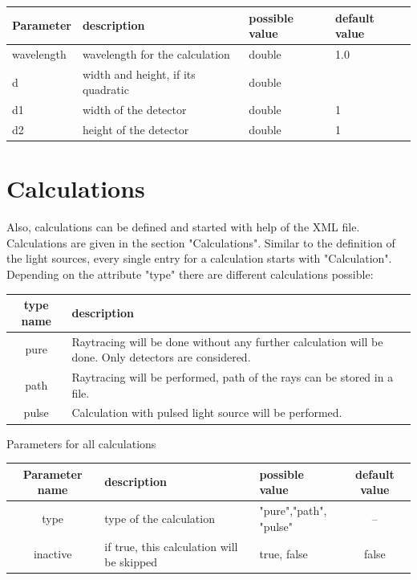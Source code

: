 \documentclass[a4paper,html,11pt,openany]{book}
\begin{document}
\begin{tabular}{p{2cm}|m{3.5cm}|m{3.0cm}|p{1.7cm}}
 Parameter  & description  & possible value & default value\\
 \hline 
 wavelength & wavelength for the calculation & double & 1.0 \\
 \hline
 d & width and height, if its quadratic & double &\\ 
 \hline
 d1 & width of the detector & double & 1 \\
\hline 
 d2 & height of the detector & double & 1 \\
 \hline  
 \end{tabular}   
 
  
  
 \chapter {Calculations}
 Also, calculations can be defined and started with help of the XML file. Calculations are given in the section "Calculations". Similar to the definition of the light sources, every single entry for a calculation starts with "Calculation". Depending on the attribute "type" there are different calculations possible:
 
 \vspace{1em}
 \begin{tabular}{c|m{8cm}}
 type name & description \\
 \hline
 pure & Raytracing will be done without any further calculation will be done. Only detectors are considered.\\
 \hline 
 path & Raytracing will be performed, path of the rays can be stored in a file. \\
  \hline
 pulse & Calculation with pulsed light source will be performed.
 \end{tabular}
 
 \vspace{1em}

 Parameters for all calculations
 \begin{table}[h!]
\fontsize{10pt}{10pt}\selectfont
 \begin{tabular}{c|m{3cm}|m{3cm}|c}
  Parameter name & description  & possible value & default value \\
 \hline
 type & type of the calculation & \parbox{3cm}{"pure","path",\\"pulse"} & -- \\
 \hline
 inactive & if true, this calculation will be skipped & true, false & false \\
 \hline 
 \end{tabular}
 \end{table}
\end{document}
